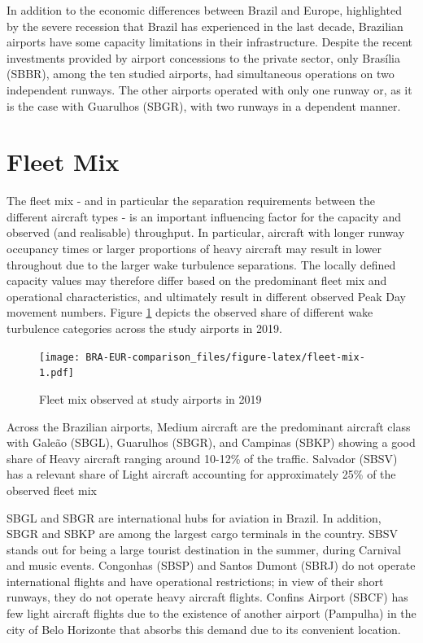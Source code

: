 \documentclass[
]{book}
\begin{document}
In addition to the economic differences between Brazil and Europe, highlighted by the severe recession that Brazil has experienced in the last decade, Brazilian airports have some capacity limitations in their infrastructure.
Despite the recent investments provided by airport concessions to the private sector, only Brasília (SBBR), among the ten studied airports, had simultaneous operations on two independent runways. The other airports operated with only one runway or, as it is the case with Guarulhos (SBGR), with two runways in a dependent manner.

\hypertarget{fleet-mix}{%
\section{Fleet Mix}\label{fleet-mix}}

The fleet mix - and in particular the separation requirements between the different aircraft types - is an important influencing factor for the capacity and observed (and realisable) throughput.
In particular, aircraft with longer runway occupancy times or larger proportions of heavy aircraft may result in lower throughout due to the larger wake turbulence separations.
The locally defined capacity values may therefore differ based on the predominant fleet mix and operational characteristics, and ultimately result in different observed Peak Day movement numbers.
Figure \ref{fig:fleet-mix} depicts the observed share of different wake turbulence categories across the study airports in 2019.



\begin{figure}
\centering
\texttt{[image: BRA-EUR-comparison\_files/figure-latex/fleet-mix-1.pdf]}
\caption{\label{fig:fleet-mix}Fleet mix observed at study airports in 2019}
\end{figure}

Across the Brazilian airports, Medium aircraft are the predominant aircraft class with Galeão (SBGL), Guarulhos (SBGR), and Campinas (SBKP) showing a good share of Heavy aircraft ranging around 10-12\% of the traffic.
Salvador (SBSV) has a relevant share of Light aircraft accounting for approximately 25\% of the observed fleet mix

SBGL and SBGR are international hubs for aviation in Brazil.
In addition, SBGR and SBKP are among the largest cargo terminals in the country.
SBSV stands out for being a large tourist destination in the summer, during Carnival and music events.
Congonhas (SBSP) and Santos Dumont (SBRJ) do not operate international flights and have operational restrictions; in view of their short runways, they do not operate heavy aircraft flights.
Confins Airport (SBCF) has few light aircraft flights due to the existence of another airport (Pampulha) in the city of Belo Horizonte that absorbs this demand due to its convenient location.
\end{document}
